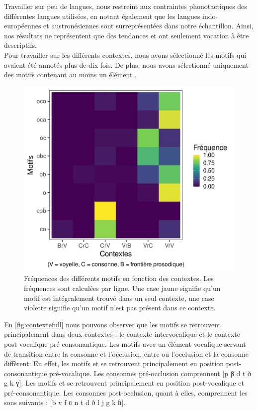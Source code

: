 Travailler sur peu de langues, nous restreint aux contraintes phonotactiques des différentes langues utilisées, en notant également que les langues indo-européennes et austronésiennes sont surreprésentées dans notre échantillon. Ainsi, nos résultats ne représentent que des tendances et ont seulement vocation à être descriptifs.\\

Pour travailler sur les différents contextes, nous avons sélectionné les motifs qui avaient été annotés plus de dix fois. De plus, nous avons sélectionné uniquement des motifs contenant au moins un élément .\\

\begin{figure}
	\centering
	\includegraphics[width=0.45\linewidth]{substance/images/contexte_full}
	\caption[Fréquences des différents motifs en fonction des contextes]{Fréquences des différents motifs en fonction des contextes. Les fréquences sont calculées par ligne. Une case jaune signifie qu'un motif est intégralement trouvé dans un seul contexte, une case violette signifie qu'un motif n'est pas présent dans ce contexte.}
	\label{fig:contextefull}
\end{figure}

En \autoref{fig:contextefull} nous pouvons observer que les motifs se retrouvent principalement dans deux contextes : le contexte intervocalique et le contexte post-vocalique pré-consonantique. 
Les motifs avec un élément vocalique servant de transition entre la consonne et l'occlusion, entre ou l'occlusion et la consonne diffèrent. En effet, les motifs  et  se retrouvent principalement en position post-consonantique pré-vocalique. Les consonnes pré-occlusion comprennent [p β d t ð g k ɣ]. Les motifs  et  se retrouvent principalement en position post-vocalique et pré-consonantique. Les consonnes post-occlusion, quant à elles, comprennent les sons suivants : [b v f ʋ n t d ð l j g k ɦ].\\

